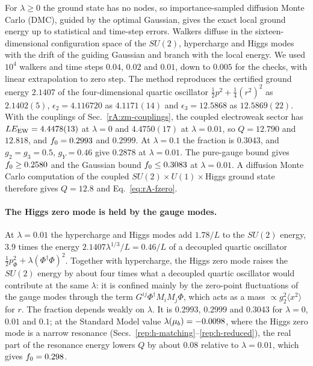 For $\lambda\geq0$ the ground state has no nodes, so importance-sampled diffusion Monte Carlo (DMC), guided by the optimal Gaussian, gives the exact local ground energy up to statistical and time-step errors.
Walkers diffuse in the sixteen-dimensional configuration space of the $SU(2)$, hypercharge and Higgs modes with the drift of the guiding Gaussian and branch with the local energy.
We used $10^4$ walkers and time steps $0.04$, $0.02$ and $0.01$, down to $0.005$ for the checks, with linear extrapolation to zero step. %
The method reproduces the certified ground energy $2.1407$ of the four-dimensional quartic oscillator $\tfrac12p^2+\tfrac14(r^2)^2$ as $2.1402(5)$, $\epsilon_2=4.116720$ as $4.1171(14)$ and $\epsilon_3=12.5868$ as $12.5869(22)$. %
With the couplings of Sec.~\ref{rA:zm-couplings}, the coupled electroweak sector has $LE_{\rm EW}=4.4478(13)$ at $\lambda=0$ and $4.4750(17)$ at $\lambda=0.01$, so $Q=12.790$ and $12.818$, and $f_0=0.2993$ and $0.2999$. %
At $\lambda=0.1$ the fraction is $0.3043$, and $g_2=g_3=0.5$, $g_Y=0.46$ give $0.2878$ at $\lambda=0.01$. %
The pure-gauge bound gives $f_0\geq0.2580$ and the Gaussian bound $f_0\leq0.3083$ at $\lambda=0.01$. %
A diffusion Monte Carlo computation of the coupled $SU(2)\times U(1)\times$Higgs ground state therefore gives $Q=12.8$ and Eq.~\eqref{eq:rA-fzero}. %

\paragraph{The Higgs zero mode is held by the gauge modes.}
At $\lambda=0.01$ the hypercharge and Higgs modes add $1.78/L$ to the $SU(2)$ energy, $3.9$ times the energy $2.1407\lambda^{1/3}/L=0.46/L$ of a decoupled quartic oscillator $\tfrac12p_\Phi^2+\lambda(\Phi^\dagger\Phi)^2$. %
Together with hypercharge, the Higgs zero mode raises the $SU(2)$ energy by about four times what a decoupled quartic oscillator would contribute at the same $\lambda$: it is confined mainly by the zero-point fluctuations of the gauge modes through the term $G^{ij}\Phi^\dagger M_iM_j\Phi$, which acts as a mass $\propto g_2^2\langle x^2\rangle$ for $r$. %
The fraction depends weakly on $\lambda$.
It is $0.2993$, $0.2999$ and $0.3043$ for $\lambda=0$, $0.01$ and $0.1$; at the Standard Model value $\lambda(\mu_b)=-0.0098$, where the Higgs zero mode is a narrow resonance (Secs.~\ref{rep:h-matching}--\ref{rep:h-reduced}), the real part of the resonance energy lowers $Q$ by about $0.08$ relative to $\lambda=0.01$, which gives $f_0=0.298$. %


